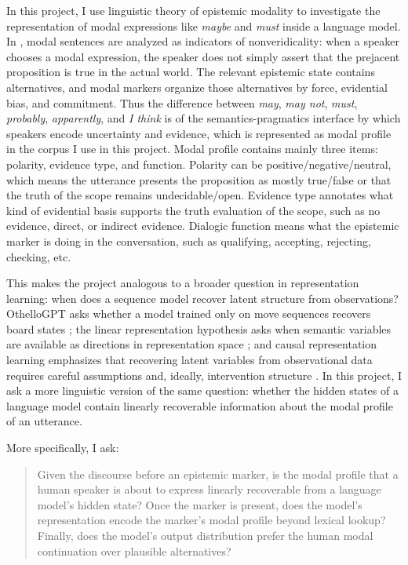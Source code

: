 \documentclass{article}
\begin{document}
In this project, I use linguistic theory of epistemic modality to investigate the representation of modal expressions like \emph{maybe} and \emph{must} inside a language model. In \citet{giannakidou_mari_2026_modal}, modal sentences are analyzed as indicators of nonveridicality: when a speaker chooses a modal expression, the speaker does not simply assert that the prejacent proposition is true in the actual world. The relevant epistemic state contains alternatives, and modal markers organize those alternatives by force, evidential bias, and commitment. Thus the difference between \emph{may}, \emph{may not}, \emph{must}, \emph{probably}, \emph{apparently}, and \emph{I think} is of the semantics-pragmatics interface by which speakers encode uncertainty and evidence, which is represented as modal profile in the corpus I use in this project. Modal profile contains mainly three items: polarity, evidence type, and function. Polarity can be positive/negative/neutral, which means the utterance presents the proposition as mostly true/false or that the truth of the scope remains undecidable/open. Evidence type annotates what kind of evidential basis supports the truth evaluation of the scope, such as no evidence, direct, or indirect evidence. Dialogic function means what the epistemic marker is doing in the conversation, such as qualifying, accepting, rejecting, checking, etc. 

This makes the project analogous to a broader question in representation learning: when does a sequence model recover latent structure from observations? OthelloGPT asks whether a model trained only on move sequences recovers board states \citep{li2022emergent}; the linear representation hypothesis asks when semantic variables are available as directions in representation space \citep{park2023linear}; and causal representation learning emphasizes that recovering latent variables from observational data requires careful assumptions and, ideally, intervention structure \citep{lippe2022citris}. In this project, I ask a more linguistic version of the same question: whether the hidden states of a language model contain linearly recoverable information about the modal profile of an utterance.

More specifically, I ask:
\begin{quote}
Given the discourse before an epistemic marker, is the modal profile that a human speaker is about to express linearly recoverable from a language model's hidden state? Once the marker is present, does the model's representation encode the marker's modal profile beyond lexical lookup? Finally, does the model's output distribution prefer the human modal continuation over plausible alternatives?
\end{quote}
\end{document}
